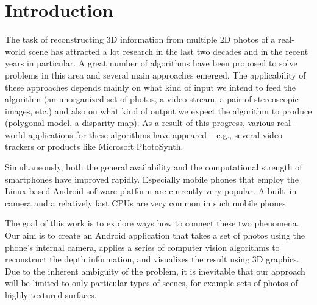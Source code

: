 \chapter*{Introduction}

The task of reconstructing 3D information from multiple 2D photos of a real-world scene has attracted a lot research in the last two decades and in the recent years in particular.
A great number of algorithms have been proposed to solve problems in this area and several main approaches emerged. 
The applicability of these approaches depends mainly on what kind of input we intend to feed the algorithm 
(an unorganized set of photos, a video stream, a pair of stereoscopic images, etc.) 
and also on what kind of output we expect the algorithm to produce (polygonal model, a disparity map). 
As a result of this progress, various real-world applications for these algorithms have appeared -- 
e.g., several video trackers or products like Microsoft PhotoSynth.

Simultaneously, both the general availability and the computational strength of smartphones have improved rapidly.
Especially mobile phones that employ the Linux-based Android software platform are currently very popular. 
A built–in camera and a relatively fast CPUs are very common in such mobile phones.

The goal of this work is to explore ways how to connect these two phenomena. 
Our aim is to create an Android application that takes a set of photos using the phone's internal camera, applies a series of computer vision algorithms to reconstruct the depth information, and visualizes the result using 3D graphics. 
Due to the inherent ambiguity of the problem, it is inevitable that our approach will be limited to only particular types of scenes, for example sets of photos of highly textured surfaces. 


